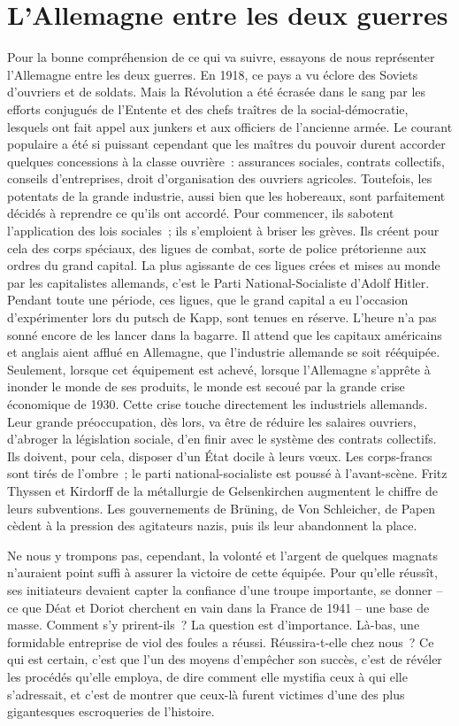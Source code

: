 \documentclass[french,twoside]{book} %
\begin{document}
\section[L’Allemagne entre les deux guerres]{L’Allemagne entre les deux guerres}
\noindent Pour la bonne compréhension de ce qui va suivre, essayons de nous représenter l’Allemagne entre les deux guerres. En 1918, ce pays a vu éclore des Soviets d’ouvriers et de soldats. Mais la Révolution a été écrasée dans le sang par les efforts conjugués de l’Entente et des chefs traîtres de la social-démocratie, lesquels ont fait appel aux junkers et aux officiers de l’ancienne armée. Le courant populaire a été si puissant cependant que les maîtres du pouvoir durent accorder quelques concessions à la classe ouvrière : assurances sociales, contrats collectifs, conseils d’entreprises, droit d’organisation des ouvriers agricoles. Toutefois, les potentats de la grande industrie, aussi bien que les hobereaux, sont parfaitement décidés à reprendre ce qu’ils ont accordé. Pour commencer, ils sabotent l’application des lois sociales ; ils s’emploient à briser les grèves. Ils créent pour cela des corps spéciaux, des ligues de combat, sorte de police prétorienne aux ordres du grand capital. La plus agissante de ces ligues crées et mises au monde par les capitalistes allemands, c’est le Parti National-Socialiste d’Adolf Hitler. Pendant toute une période, ces ligues, que le grand capital a eu l’occasion d’expérimenter lors du putsch de Kapp, sont tenues en réserve. L’heure n’a pas sonné encore de les lancer dans la bagarre. Il attend que les capitaux américains et anglais aient afflué en Allemagne, que l’industrie allemande se soit rééquipée. Seulement, lorsque cet équipement est achevé, lorsque l’Allemagne s’apprête à inonder le monde de ses produits, le monde est secoué par la grande crise économique de 1930. Cette crise touche directement les industriels allemands. Leur grande préoccupation, dès lors, va être de réduire les salaires ouvriers, d’abroger la législation sociale, d’en finir avec le système des contrats collectifs. Ils doivent, pour cela, disposer d’un État docile à leurs vœux. Les corps-francs sont tirés de l’ombre ; le parti national-socialiste est poussé à l’avant-scène. Fritz Thyssen et Kirdorff de la métallurgie de Gelsenkirchen augmentent le chiffre de leurs subventions. Les gouvernements de Brüning, de Von Schleicher, de Papen cèdent à la pression des agitateurs nazis, puis ils leur abandonnent la place.\par
Ne nous y trompons pas, cependant, la volonté et l’argent de quelques magnats n’auraient point suffi à assurer la victoire de cette équipée. Pour qu’elle réussît, ses initiateurs devaient capter la confiance d’une troupe importante, se donner – ce que Déat et Doriot cherchent en vain dans la France de 1941 – une base de masse. Comment s’y prirent-ils ? La question est d’importance. Là-bas, une formidable entreprise de viol des foules a réussi. Réussira-t-elle chez nous ? Ce qui est certain, c’est que l’un des moyens d’empêcher son succès, c’est de révéler les procédés qu’elle employa, de dire comment elle mystifia ceux à qui elle s’adressait, et c’est de montrer que ceux-là furent victimes d’une des plus gigantesques escroqueries de l’histoire.
\end{document}
